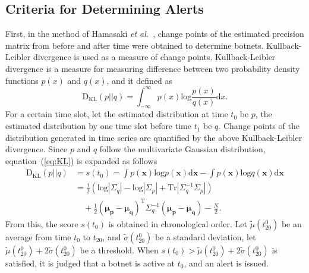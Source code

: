 \documentclass{sig-alternate-10pt}
\begin{document}
\subsection{Criteria for Determining Alerts}
First, in the method of Hamasaki {\it et al.}~\cite{Hamasaki}, change points of the estimated precision matrix from before and after time were obtained to determine botnets.
Kullback-Leibler divergence is used as a measure of change points.
Kullback-Leibler divergence is a measure for measuring difference between two probability density functions $p(x)$ and $q(x)$, and it defined as
\begin{equation}
\label{eq:KL}
\mathrm{D_{KL}}(p||q)=\int^{\infty}_{-\infty}{p(x)}\mathrm{log}\frac{p(x)}{q(x)}\mathrm{d}x.
\end{equation}
For a certain time slot, let the estimated distribution at time $t_{0}$ be $p$, the estimated distribution by one time slot before time $t_{1}$ be $q$.
Change points of the distribution generated in time series are quantified by the above Kullback-Leibler divergence.
Since $p$ and $q$ follow the multivariate Gaussian distribution, equation~(\ref{eq:KL}) is expanded as follows 
\begin{equation*}
\begin{split}
\mathrm{D_{KL}}(p||q) &= s(t_{0}) = \int{p(\bm{x})}\mathrm{log}{p(\bm{x})}\mathrm{d}\bm{x}-\int{p(\bm{x})}\mathrm{log}{q(\bm{x})}\mathrm{d}\bm{x}\\
	&= \frac{1}{2}(\mathrm{log}|\Sigma_{q}|-\mathrm{log}|\Sigma_{p}|+\mathrm{Tr}|\Sigma^{-1}_{q}\Sigma_{p}|)\\
	&\quad+\frac{1}{2}(\bm{\mu_{p}}-\bm{\mu_{q}})^{\mathrm{T}}\Sigma^{-1}_{q}(\bm{\mu_{p}}-\bm{\mu_{q}})-\frac{N}{2}.
\end{split}
\end{equation*}
From this, the score $s(t_{0})$ is obtained in chronological order.
Let $\tilde{\mu}(t_{20}^{0})$ be an average from time $t_{0}$ to $t_{20}$, and $\tilde{\sigma}(t_{20}^{0})$ be a standard deviation, let $\tilde{\mu}(t_{20}^{0})+2\tilde{\sigma}(t_{20}^{0})$ be a threshold.
When $s(t_{0})>\tilde{\mu}(t_{20}^{0})+2\tilde{\sigma}(t_{20}^{0})$ is satisfied, it is judged that a botnet is active at $t_{0}$, and an alert is issued.
\end{document}
